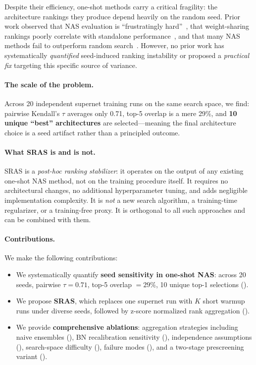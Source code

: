 \documentclass[10pt,twocolumn,letterpaper]{article}
\newcommand{\method}{SRAS}
\begin{document}
Despite their efficiency, one-shot methods carry a critical fragility: the architecture rankings they produce depend heavily on the random seed. Prior work observed that NAS evaluation is ``frustratingly hard''~\cite{yang2020nas}, that weight-sharing rankings poorly correlate with standalone performance~\cite{yu2020evaluating}, and that many NAS methods fail to outperform random search~\cite{li2020random}. However, no prior work has systematically \textit{quantified} seed-induced ranking instability or proposed a \textit{practical fix} targeting this specific source of variance.

\paragraph{The scale of the problem.} Across 20 independent supernet training runs on the same search space, we find: pairwise Kendall's $\tau$ averages only 0.71, top-5 overlap is a mere 29\%, and \textbf{10 unique ``best'' architectures} are selected---meaning the final architecture choice is a seed artifact rather than a principled outcome.

\paragraph{What \method{} is and is not.} \method{} is a \textit{post-hoc ranking stabilizer}: it operates on the output of any existing one-shot NAS method, not on the training procedure itself. It requires no architectural changes, no additional hyperparameter tuning, and adds negligible implementation complexity. It is \textit{not} a new search algorithm, a training-time regularizer, or a training-free proxy. It is orthogonal to all such approaches and can be combined with them.

\paragraph{Contributions.} We make the following contributions:
\begin{itemize}
    \item We systematically quantify \textbf{seed sensitivity in one-shot NAS}: across 20 seeds, pairwise $\tau = 0.71$, top-5 overlap $= 29\%$, 10 unique top-1 selections ().
    \item We propose \textbf{\method{}}, which replaces one supernet run with $K$ short warmup runs under diverse seeds, followed by z-score normalized rank aggregation ().
    \item We provide \textbf{comprehensive ablations}: aggregation strategies including naive ensembles (), BN recalibration sensitivity (), independence assumptions (), search-space difficulty (), failure modes (), and a two-stage prescreening variant ().
\end{itemize}
\end{document}
